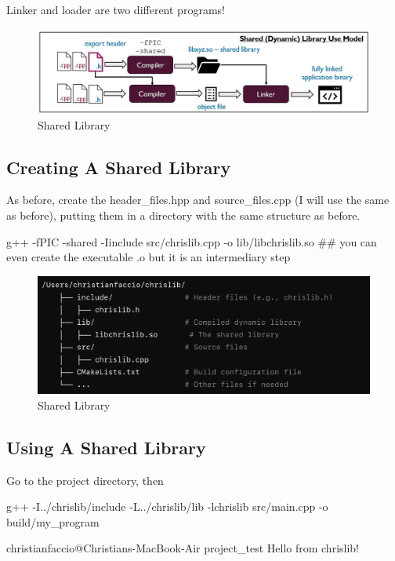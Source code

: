 \begin{warningblock}
    Linker and loader are two different programs!
\end{warningblock}

\begin{figure}[H]
    \centering
    \includegraphics[width=\textwidth]{assets/dynamic_lib.jpeg}
    \caption{Shared Library}
\end{figure}

\subsection*{Creating A Shared Library}

As before, create the header\_files.hpp and source\_files.cpp (I will use the same as before), putting them in a directory with the same structure as before. 
\begin{codeblock}[language=bash]
g++ -fPIC -shared -Iinclude src/chrislib.cpp -o lib/libchrislib.so  ## you can even create the executable .o but it is an intermediary step
\end{codeblock}

\begin{figure}[H]
    \centering
    \includegraphics[width=\textwidth]{assets/dynamic_lib_dir.png}
    \caption{Shared Library}
\end{figure}

\subsection*{Using A Shared Library}


Go to the project directory, then
\begin{codeblock}[language=bash]
g++ -I../chrislib/include -L../chrislib/lib -lchrislib src/main.cpp -o build/my_program  
\end{codeblock}
\begin{codeblock}[language=bash]
christianfaccio@Christians-MacBook-Air project_test %
Hello from chrislib!
\end{codeblock}

